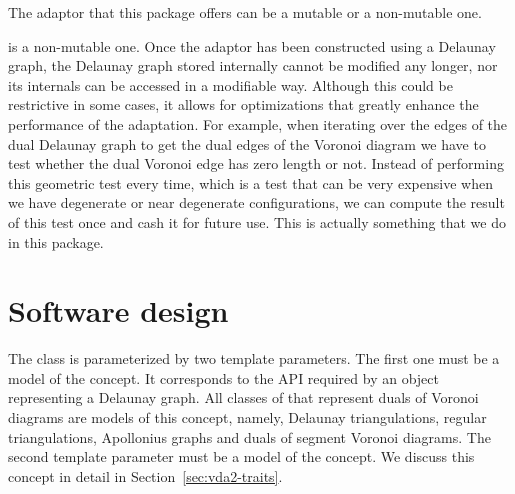 

The adaptor that this package offers can be a mutable or a non-mutable one.

is a non-mutable one. Once
the adaptor has been constructed using a Delaunay graph, the Delaunay
graph stored internally cannot be modified any longer, nor its internals
can be accessed in a modifiable way. Although this could be
restrictive in some cases, it allows for optimizations that greatly
enhance the performance of the adaptation. For example, when iterating
over the edges of the dual Delaunay graph to get the dual edges of the
Voronoi diagram we have to test whether the dual Voronoi edge has zero
length or not. Instead of performing this geometric test every time,
which is a test that can be very expensive when we have degenerate or
near degenerate configurations, we can compute the result of this test
once and cash it for future use. This is actually something that we do
in this package.

\section{Software design}
\label{sec:vda2-design}

The  class is parameterized by
two template parameters. The first one must be a model of the
 concept. It corresponds to the API required by
an object representing a Delaunay graph. All classes of \cgal that
represent duals of Voronoi diagrams are models of this concept,
namely, Delaunay triangulations, regular triangulations, Apollonius
graphs and duals of segment Voronoi diagrams.
%
The second template parameter must be a model of the
 concept. We discuss this concept in detail in
Section~\ref{sec:vda2-traits}.


